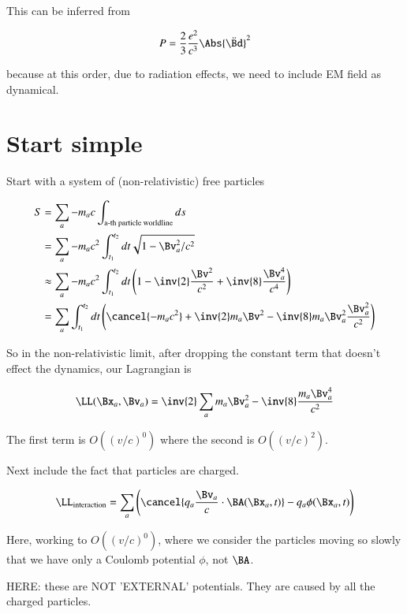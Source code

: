 This can be inferred from 

\begin{equation}\label{eqn:relativisticElectrodynamicsL24:70}
P = \frac{2}{3} \frac{e^2}{c^3} \Abs{\ddot{\Bd}}^2
\end{equation}

because at this order, due to radiation effects, we need to include EM field as dynamical.

\section{Start simple}

Start with a system of (non-relativistic) free particles

\begin{align*}
S 
&= \sum_a - m_a c \int_{\text{a-th particle worldline}} ds  \\
&= \sum_a -m_a c^2 \int_{t_1}^{t_2} dt \sqrt{ 1 - \Bv_a^2/c^2} \\
&\approx \sum_a -m_a c^2 \int_{t_1}^{t_2} dt \left( 1 - \inv{2} \frac{\Bv^2}{c^2} + \inv{8} \frac{\Bv_a^4}{c^4}
\right) \\
&= \sum_a \int_{t_1}^{t_2} dt \left( \cancel{-m_a c^2} + \inv{2} m_a \Bv^2 - \inv{8} m_a \Bv_a^2 \frac{\Bv_a^2}{c^2} \right) \\
\end{align*}

So in the non-relativistic limit, after dropping the constant term that doesn't effect the dynamics, our Lagrangian is 

\begin{equation}\label{eqn:relativisticElectrodynamicsL24:90}
\LL(\Bx_a, \Bv_a) = \inv{2} \sum_a m_a \Bv_a^2 - \inv{8} \frac{m_a \Bv_a^4}{c^2}
\end{equation}

The first term is $O((v/c)^0)$ where the second is $O((v/c)^2)$.

Next include the fact that particles are charged.

\begin{equation}\label{eqn:relativisticElectrodynamicsL24:110}
\LL_{\text{interaction}} = \sum_a \left( \cancel{q_a \frac{\Bv_a}{c} \cdot \BA(\Bx_a, t)} - q_a \phi(\Bx_a, t) \right)
\end{equation}

Here, working to $O((v/c)^0)$, where we consider the particles moving so slowly that we have only a Coulomb potential $\phi$, not $\BA$.

HERE: these are NOT 'EXTERNAL' potentials.  They are caused by all the charged particles.

